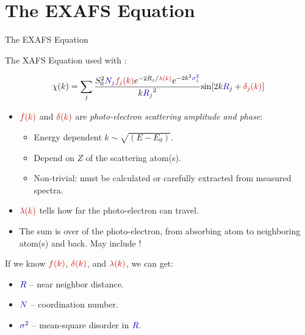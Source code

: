 \section{The EXAFS Equation}

\begin{slide}{The EXAFS Equation}  %

  \begin{cenpage}{135mm}

  The XAFS Equation used with {\feff}:

  \[
  \chi(k) = \sum_j {{ S_0^2 {\Blue{N_j}} {\Red{f_j(k)}}  e^{-2R_j/{\Red{\lambda(k)}}}
      e^{-2k^2{\Blue{\sigma_j^2}}}}\over{k{\Blue{R_j}}^2}}
  {\sin[{2k{\Blue{R_j}} + {\Red{\delta_j(k)}}} ]}
   \]

   \begin{itemize}
  \item $\Red{f(k)}$ and $\Red{\delta(k)}$ are  {\emph{photo-electron scattering
        amplitude and phase}}:
    \begin{itemize}
    \item Energy dependent    \hspace{3mm}  $k \sim \sqrt{(E-E_0)} $.
    \item Depend on $Z$ of the scattering atom(s).
    \item Non-trivial: must be calculated or carefully extracted from  measured spectra.
    \end{itemize}

\item $\Red{\lambda(k)}$ tells how far the photo-electron can travel.

\item The sum is over {} of the photo-electron,
  from absorbing atom to neighboring atom(s) and back.  May include
  {}!

\end{itemize}

   \begin{postitbox}{64mm}
     If we know $\Red{f(k)}$,  $\Red{\delta(k)}$, and $\Red{\lambda(k)}$, we can get:
     \begin{itemize}
     \item ${\Blue{R}}$ --  near neighbor distance.
     \item ${\Blue{N}}$ -- coordination number.
     \item ${\Blue{\sigma^2}}$ -- mean-square  disorder in ${\Blue{R}}$.
     \end{itemize}
   \end{postitbox}

\end{cenpage}  \end{slide}
